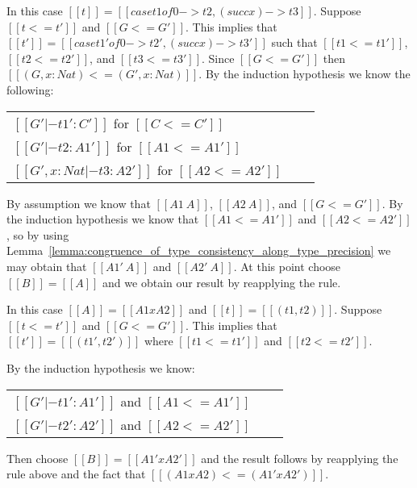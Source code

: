 \begin{description}
  \noindent
  In this case $[[t]] = [[case t1 of 0 -> t2, (succ x) -> t3]]$.  Suppose $[[t <= t']]$ and $[[G <= G']]$.  This
  implies that \\ $[[t']] = [[case t1' of 0 -> t2', (succ x) -> t3']]$ such that
  $[[t1 <= t1']]$, $[[t2 <= t2']]$, and $[[t3 <= t3']]$.  Since $[[G <= G']]$ then $[[(G,x:Nat) <= (G',x:Nat)]]$.
  By the induction hypothesis we know the following:
  \begin{center}
    \begin{tabular}{lll}
      $[[G' |- t1' : C']]$ for $[[C <= C']]$\\
      $[[G' |- t2 : A1']]$ for $[[A1 <= A1']]$\\
      $[[G', x : Nat |- t3 : A2']]$ for $[[A2 <= A2']]$
    \end{tabular}
  \end{center}
  By assumption we know that $[[A1 ~ A]]$, $[[A2 ~ A]]$, and $[[G <= G']]$.
  By the induction hypothesis we know that $[[A1 <= A1']]$ and $[[A2 <= A2']]$, so
  by using Lemma~\ref{lemma:congruence_of_type_consistency_along_type_precision} we may obtain that
  $[[A1' ~ A]]$ and $[[A2' ~ A]]$.  At this point choose $[[B]] = [[A]]$
  and we obtain our result by reapplying the rule.
  
\item[]
\item

  \noindent
  In this case $[[A]] = [[A1 x A2]]$ and $[[t]] = [[(t1,t2)]]$. Suppose
  $[[t <= t']]$ and $[[G <= G']]$.  This implies that $[[t']] = [[(t1',t2')]]$ where
  $[[t1 <= t1']]$ and $[[t2 <= t2']]$.
  
  By the induction hypothesis we know:
  \begin{center}
    \begin{tabular}{lll}
      $[[G' |- t1' : A1']]$ and $[[A1 <= A1']]$\\
      $[[G' |- t2' : A2']]$ and $[[A2 <= A2']]$\\
    \end{tabular}
  \end{center}
  Then choose $[[B]] = [[A1' x A2']]$ and the result follows by reapplying
  the rule above and the fact that $[[(A1 x A2) <= (A1' x A2')]]$.  


\end{description}
